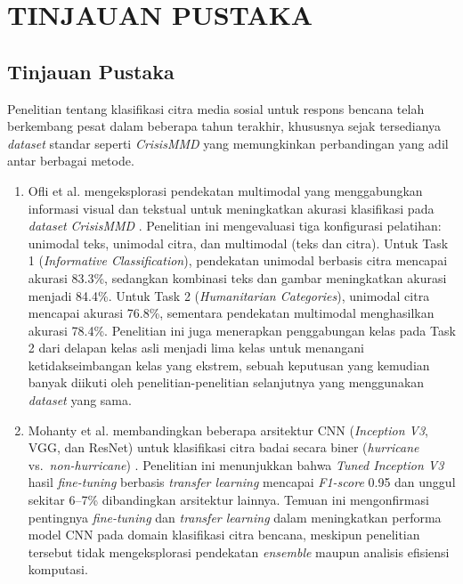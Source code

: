 \newpage
\chapter{TINJAUAN PUSTAKA} \label{Bab II}

\section{Tinjauan Pustaka} \label{II.Tinjauan}
Penelitian tentang klasifikasi citra media sosial untuk respons bencana
telah berkembang pesat dalam beberapa tahun terakhir, khususnya sejak
tersedianya \textit{dataset} standar seperti \textit{CrisisMMD} yang
memungkinkan perbandingan yang adil antar berbagai metode. \par

\begin{enumerate}[noitemsep]
    \item Ofli et al. mengeksplorasi pendekatan multimodal yang
    menggabungkan informasi visual dan tekstual untuk meningkatkan
    akurasi klasifikasi pada \textit{dataset} \textit{CrisisMMD}
    \cite{ofli2020analysis}. Penelitian ini mengevaluasi tiga
    konfigurasi pelatihan: unimodal teks, unimodal citra, dan
    multimodal (teks dan citra). Untuk Task 1 (\textit{Informative
    Classification}), pendekatan unimodal berbasis citra mencapai
    akurasi 83.3\%, sedangkan kombinasi teks dan gambar meningkatkan
    akurasi menjadi 84.4\%. Untuk Task 2 (\textit{Humanitarian
    Categories}), unimodal citra mencapai akurasi 76.8\%, sementara
    pendekatan multimodal menghasilkan akurasi 78.4\%. Penelitian ini
    juga menerapkan penggabungan kelas pada Task 2 dari delapan kelas
    asli menjadi lima kelas untuk menangani ketidakseimbangan kelas
    yang ekstrem, sebuah keputusan yang kemudian banyak diikuti
    oleh penelitian-penelitian selanjutnya yang menggunakan
    \textit{dataset} yang sama.

    \item Mohanty et al. membandingkan beberapa arsitektur CNN
    (\textit{Inception V3}, VGG, dan ResNet) untuk klasifikasi citra
    badai secara biner (\textit{hurricane} vs.\ \textit{non-hurricane})
    \cite{mohanty2021multimodal}. Penelitian ini menunjukkan bahwa
    \textit{Tuned Inception V3} hasil \textit{fine-tuning} berbasis
    \textit{transfer learning} mencapai \textit{F1-score} 0.95 dan
    unggul sekitar 6--7\% dibandingkan arsitektur lainnya. Temuan ini
    mengonfirmasi pentingnya \textit{fine-tuning} dan \textit{transfer
    learning} dalam meningkatkan performa model CNN pada domain
    klasifikasi citra bencana, meskipun penelitian tersebut tidak
    mengeksplorasi pendekatan \textit{ensemble} maupun analisis
    efisiensi komputasi.


\end{enumerate}
